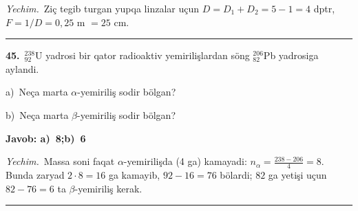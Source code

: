 \documentclass[11pt,a4paper]{article}
\begin{document}
\noindent\textit{Yechim.}\ Ziç tegib turgan yupqa linzalar uçun $D=D_1+D_2=5-1=4$ dptr, $F=1/D=0{,}25$ m $=25$ cm.\par\par\medskip\hrule\medskip
{}\noindent\textbf{45.}\ $^{238}_{92}$U yadrosi bir qator radioaktiv yemirilişlardan söng $^{206}_{82}$Pb yadrosiga aylandi.\par
\noindent\hspace*{4mm}a)\ Neça marta $\alpha$-yemiriliş sodir bölgan?\par
\noindent\hspace*{4mm}b)\ Neça marta $\beta$-yemiriliş sodir bölgan?\par
\noindent\colorbox{gray!12}{\parbox{\dimexpr\linewidth-2\fboxsep}{\textbf{Javob: a)\ 8;\quad b)\ 6}}}\par\smallskip
\noindent\textit{Yechim.}\ Massa soni faqat $\alpha$-yemirilişda (4 ga) kamayadi: $n_\alpha=\frac{238-206}{4}=8$. Bunda zaryad $2\cdot8=16$ ga kamayib, $92-16=76$ bölardi; $82$ ga yetişi uçun $82-76=6$ ta $\beta$-yemiriliş kerak.\par\par\medskip\hrule\medskip
\end{document}
